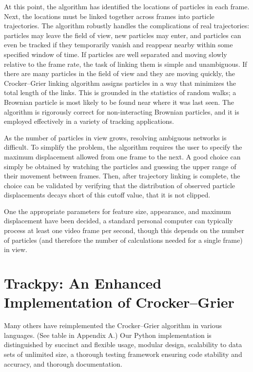 At this point, the algorithm has identified the locations of particles in each frame. Next, the locations must be linked together across frames into particle trajectories. The algorithm robustly handles the complications of real trajectories: particles may leave the field of view, new particles may enter, and particles can even be tracked if they temporarily vanish and reappear nearby within some specified window of time. If particles are well separated and moving slowly relative to the frame rate, the task of linking them is simple and unambiguous. If there are many particles in the field of view and they are moving quickly, the Crocker--Grier linking algorithm assigns particles in a way that minimizes the total length of the links. This is grounded in the statistics of random walks; a Brownian particle is most likely to be found near where it was last seen. The algorithm is rigorously correct for non-interacting Brownian particles\cite{Crocker1996}, and it is employed effectively in a variety of tracking applications.

As the number of particles in view grows, resolving ambiguous networks is difficult. To simplify the problem, the algorithm requires the user to specify the maximum displacement allowed from one frame to the next. A good choice can simply be obtained by watching the particles and guessing the upper range of their movement between frames. Then, after trajectory linking is complete, the choice can be validated by verifying that the distribution of observed particle displacements decays short of this cutoff value, that it is not clipped.

One the appropriate parameters for feature size, appearance, and maximum displacement have been decided, a standard personal computer can typically process at least one video frame per second, though this depends on the number of particles (and therefore the number of calculations needed for a single frame) in view.

\section{Trackpy: An Enhanced Implementation of Crocker--Grier}

Many others have reimplemented the Crocker--Grier algorithm in various languages. (See table in Appendix A.) Our Python implementation is distinguished by succinct and flexible usage, modular design, scalability to data sets of unlimited size, a thorough testing framework ensuring code stability and accuracy, and thorough documentation.

